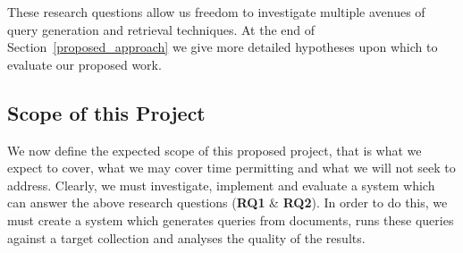 \documentclass{mprop}
\begin{document}
These research questions allow us freedom to investigate multiple avenues of query generation and retrieval techniques. At the end of Section~\ref{proposed_approach} we give more detailed hypotheses upon which to evaluate our proposed work.


\subsection{Scope of this Project}
We now define the expected scope of this proposed project, that is what we expect to cover, what we may cover time permitting and what we will not seek to address. 
Clearly, we must investigate, implement and evaluate a system which can answer the above research questions (\textbf{RQ1} \& \textbf{RQ2}). 
In order to do this, we must create a system which generates queries from documents, runs these queries against a target collection and analyses the quality of the results.
\end{document}
